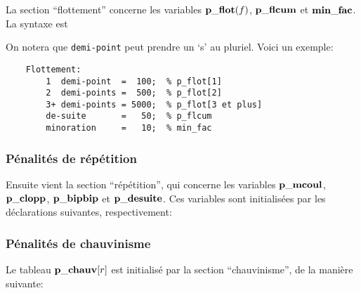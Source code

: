\documentclass[10pt]{article}
\begin{document}
La section ``flottement'' concerne les variables ${\bf p\_flot}(f)$,
$\bf p\_flcum$ et $\bf min\_fac$. La syntaxe est

\medbreak
{}
\medbreak

\noindent On notera que \verb|demi-point| peut prendre un `s' au pluriel.
Voici un exemple:
\begin{verbatim}
    Flottement:
        1  demi-point  =  100;  % p_flot[1]
        2  demi-points =  500;  % p_flot[2]
        3+ demi-points = 5000;  % p_flot[3 et plus]
        de-suite       =   50;  % p_flcum
        minoration     =   10;  % min_fac
\end{verbatim}

\subsubsection{P\'enalit\'es de r\'ep\'etition}

Ensuite vient la section ``r\'ep\'etition'', qui concerne les variables
$\bf p\_mcoul$, $\bf p\_clopp$, $\bf p\_bipbip$ et $\bf p\_desuite$. Ces
variables sont initialis\'ees par les d\'eclara\-tions suivantes,
respectivement:

\medbreak
{}
\medbreak

\subsubsection{P\'enalit\'es de chauvinisme}

Le tableau ${\bf p\_chauv}[r]$ est initialis\'e par la section
``chauvinisme'', de la mani\`ere suivante:

\medbreak
{}
\medbreak
\end{document}
